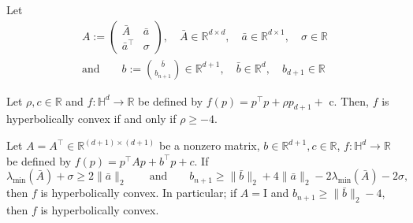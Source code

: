 \documentclass[twoside,11pt]{article}
\begin{document}
Let 
\[
\begin{gathered}
     A:=\left(\begin{array}{cc}
\bar{A} & \bar{a} \\
\bar{a}^{\top} & \sigma
\end{array}\right), \quad \bar{A} \in \mathbb{R}^{d \times d}, \quad \bar{a} \in \mathbb{R}^{d \times 1}, \quad \sigma \in \mathbb{R} \\
\text{and} \qquad b:=\binom{\bar{b}}{b_{n+1}} \in \mathbb{R}^{d+1}, \quad \bar{b} \in \mathbb{R}^d, \quad b_{d+1} \in \mathbb{R}
\end{gathered}
\]

\begin{prop}
    Let $\rho, c \in \mathbb{R}$ and $f: \mathbb{H}^d \rightarrow \mathbb{R}$ be defined by $f(p)=p^{\top} p+\rho p_{d+1}+$ c. Then, $f$ is hyperbolically convex if and only if $\rho \geq-4$.
\end{prop}

\begin{prop}\label{prop:nonhom_gconvex}
    Let $A=A^{\top} \in \mathbb{R}^{(d+1) \times(d+1)}$ be a nonzero matrix, $b \in \mathbb{R}^{d+1}, c \in \mathbb{R}$, $f: \mathbb{H}^d \rightarrow \mathbb{R}$ be defined by $f(p)=p^{\top} A p+b^{\top} p+c$. If 
    \[\lambda_{\min }(\bar{A})+\sigma \geq 2\|\bar{a}\|_2 \qquad \text{and} \qquad b_{n+1} \geq\|\bar{b}\|_2+4\|\bar{a}\|_2-2 \lambda_{\min }(\bar{A})-2 \sigma,\] 
    then $f$ is hyperbolically convex. In particular; if $A=\mathrm{I}$ and $b_{n+1} \geq\|\bar{b}\|_2-4$, then $f$ is hyperbolically convex.
\end{prop}
\end{document}
